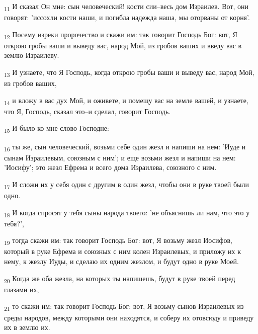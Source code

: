 \begin{tcolorbox}
\textsubscript{11} И сказал Он мне: сын человеческий! кости сии--весь дом Израилев. Вот, они говорят: 'иссохли кости наши, и погибла надежда наша, мы оторваны от корня'.
\end{tcolorbox}
\begin{tcolorbox}
\textsubscript{12} Посему изреки пророчество и скажи им: так говорит Господь Бог: вот, Я открою гробы ваши и выведу вас, народ Мой, из гробов ваших и введу вас в землю Израилеву.
\end{tcolorbox}
\begin{tcolorbox}
\textsubscript{13} И узнаете, что Я Господь, когда открою гробы ваши и выведу вас, народ Мой, из гробов ваших,
\end{tcolorbox}
\begin{tcolorbox}
\textsubscript{14} и вложу в вас дух Мой, и оживете, и помещу вас на земле вашей, и узнаете, что Я, Господь, сказал это--и сделал, говорит Господь.
\end{tcolorbox}
\begin{tcolorbox}
\textsubscript{15} И было ко мне слово Господне:
\end{tcolorbox}
\begin{tcolorbox}
\textsubscript{16} ты же, сын человеческий, возьми себе один жезл и напиши на нем: 'Иуде и сынам Израилевым, союзным с ним'; и еще возьми жезл и напиши на нем: 'Иосифу'; это жезл Ефрема и всего дома Израилева, союзного с ним.
\end{tcolorbox}
\begin{tcolorbox}
\textsubscript{17} И сложи их у себя один с другим в один жезл, чтобы они в руке твоей были одно.
\end{tcolorbox}
\begin{tcolorbox}
\textsubscript{18} И когда спросят у тебя сыны народа твоего: 'не объяснишь ли нам, что это у тебя?',
\end{tcolorbox}
\begin{tcolorbox}
\textsubscript{19} тогда скажи им: так говорит Господь Бог: вот, Я возьму жезл Иосифов, который в руке Ефрема и союзных с ним колен Израилевых, и приложу их к нему, к жезлу Иуды, и сделаю их одним жезлом, и будут одно в руке Моей.
\end{tcolorbox}
\begin{tcolorbox}
\textsubscript{20} Когда же оба жезла, на которых ты напишешь, будут в руке твоей перед глазами их,
\end{tcolorbox}
\begin{tcolorbox}
\textsubscript{21} то скажи им: так говорит Господь Бог: вот, Я возьму сынов Израилевых из среды народов, между которыми они находятся, и соберу их отовсюду и приведу их в землю их.
\end{tcolorbox}
